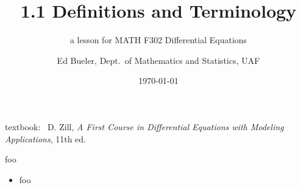 \documentclass{beamer}
\title{1.1 Definitions and Terminology}
\subtitle{a lesson for MATH F302 Differential Equations}
\date{\today}
\author{Ed Bueler, Dept.~of Mathematics and Statistics, UAF}
\begin{document}
\begin{frame}
\titlepage

\centerline{\tiny textbook: \, D. Zill, \emph{A First Course in Differential Equations with Modeling Applications}, 11th ed.}
\end{frame}

\begin{frame}{foo}

\begin{itemize}
\item foo
\end{itemize}
\end{frame}
\end{document}
